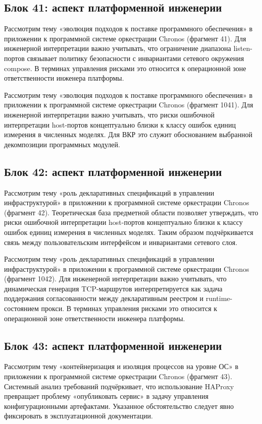 \subsection{Блок 41: аспект платформенной инженерии}
 Рассмотрим тему «эволюция подходов к поставке программного обеспечения» в приложении к программной системе оркестрации Chronos (фрагмент 41). Для инженерной интерпретации важно учитывать, что ограничение диапазона listen-портов связывает политику безопасности с инвариантами сетевого окружения compose. В терминах управления рисками это относится к операционной зоне ответственности инженера платформы.

 Рассмотрим тему «эволюция подходов к поставке программного обеспечения» в приложении к программной системе оркестрации Chronos (фрагмент 1041). Для инженерной интерпретации важно учитывать, что риски ошибочной интерпретации host-портов концептуально близки к классу ошибок единиц измерения в численных моделях. Для ВКР это служит обоснованием выбранной декомпозиции программных модулей.

\subsection{Блок 42: аспект платформенной инженерии}
 Рассмотрим тему «роль декларативных спецификаций в управлении инфраструктурой» в приложении к программной системе оркестрации Chronos (фрагмент 42). Теоретическая база предметной области позволяет утверждать, что риски ошибочной интерпретации host-портов концептуально близки к классу ошибок единиц измерения в численных моделях. Таким образом подчёркивается связь между пользовательским интерфейсом и инвариантами сетевого слоя.

 Рассмотрим тему «роль декларативных спецификаций в управлении инфраструктурой» в приложении к программной системе оркестрации Chronos (фрагмент 1042). Для инженерной интерпретации важно учитывать, что динамическая генерация TCP-маршрутов интерпретируется как задача поддержания согласованности между декларативным реестром и runtime-состоянием прокси. В терминах управления рисками это относится к операционной зоне ответственности инженера платформы.

\subsection{Блок 43: аспект платформенной инженерии}
 Рассмотрим тему «контейнеризация и изоляция процессов на уровне ОС» в приложении к программной системе оркестрации Chronos (фрагмент 43). Системный анализ требований подчёркивает, что использование HAProxy превращает проблему «опубликовать сервис» в задачу управления конфигурационными артефактами. Указанное обстоятельство следует явно фиксировать в эксплуатационной документации.

